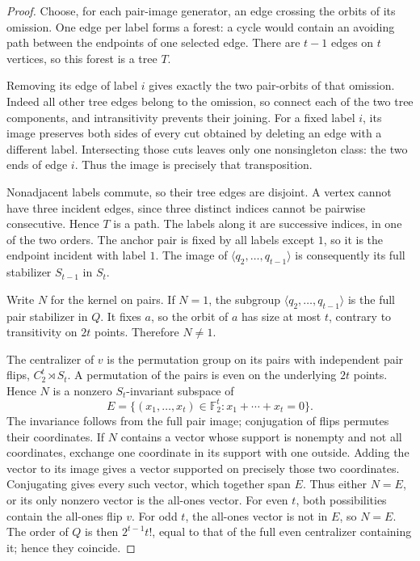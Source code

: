 \documentclass[11pt,a4paper]{article}
\newcommand{\gen}[1]{\langle#1\rangle}
\begin{document}
\begin{proof}
Choose, for each pair-image generator, an edge crossing the
orbits of its omission. One edge per label forms a forest:
a cycle would contain an avoiding path between the endpoints
of one selected edge. There are $t-1$ edges on $t$ vertices,
so this forest is a tree $T$.

Removing its edge of label $i$ gives exactly the two pair-orbits
of that omission. Indeed all other tree edges belong to the
omission, so connect each of the two tree components, and
intransitivity prevents their joining. For a fixed label $i$,
its image preserves both sides of every cut obtained by deleting
an edge with a different label. Intersecting those cuts leaves
only one nonsingleton class: the two ends of edge $i$.
Thus the image is precisely that transposition.

Nonadjacent labels commute, so their tree edges are disjoint.
A vertex cannot have three incident edges, since three distinct
indices cannot be pairwise consecutive. Hence $T$ is a path.
The labels along it are successive indices, in one of the two
orders. The anchor pair is fixed by all labels except $1$,
so it is the endpoint incident with label $1$. The image of
$\gen{q_2,\ldots,q_{t-1}}$ is consequently its full stabilizer
$S_{t-1}$ in $S_t$.

Write $N$ for the kernel on pairs. If $N=1$, the subgroup
$\gen{q_2,\ldots,q_{t-1}}$ is the full pair stabilizer in $Q$.
It fixes $a$, so the orbit of $a$ has size at most $t$,
contrary to transitivity on $2t$ points. Therefore $N\ne1$.

The centralizer of $v$ is the permutation group on its pairs
with independent pair flips, $C_2^t\rtimes S_t$. A permutation
of the pairs is even on the underlying $2t$ points. Hence
$N$ is a nonzero $S_t$-invariant subspace of
\[
 E=\{(x_1,\ldots,x_t)\in\mathbb F_2^t:
                         x_1+\cdots+x_t=0\}.
\]
The invariance follows from the full pair image; conjugation
of flips permutes their coordinates. If $N$ contains a vector
whose support is nonempty and not all coordinates, exchange
one coordinate in its support with one outside. Adding the
vector to its image gives a vector supported on precisely
those two coordinates. Conjugating gives every such vector,
which together span $E$. Thus either $N=E$, or its only
nonzero vector is the all-ones vector. For even $t$, both
possibilities contain the all-ones flip $v$. For odd $t$,
the all-ones vector is not in $E$, so $N=E$. The order of
$Q$ is then $2^{t-1}t!$, equal to that of the full even
centralizer containing it; hence they coincide.
\end{proof}
\end{document}
